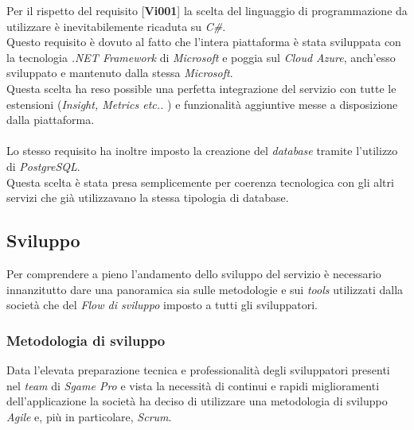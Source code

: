 \documentclass[11pt]{thesistemp}
\begin{document}
Per il rispetto del requisito [\textbf{Vi001}] la scelta del linguaggio di programmazione da utilizzare è inevitabilemente ricaduta su \textit{C\#}.\\
Questo requisito è dovuto al fatto che l'intera piattaforma è stata sviluppata con la tecnologia \textit{.NET Framework} di \textit{Microsoft} e poggia sul \textit{Cloud Azure}, anch'esso sviluppato e mantenuto dalla stessa \textit{Microsoft}.\\
Questa scelta ha reso possible una perfetta integrazione del servizio con tutte le estensioni (\textit{Insight, Metrics etc.. }) e funzionalità aggiuntive messe a disposizione dalla piattaforma.\\\\
Lo stesso requisito ha inoltre imposto la creazione del \textit{database} tramite l'utilizzo di \textit{PostgreSQL}.\\
Questa scelta è stata presa semplicemente per coerenza tecnologica con gli altri servizi che già utilizzavano la stessa tipologia di database.

\pagebreak
\subsection{Sviluppo}
Per comprendere a pieno l'andamento dello sviluppo del servizio è necessario innanzitutto dare una panoramica sia sulle metodologie e sui \textit{tools} utilizzati dalla società che del \textit{Flow di sviluppo} imposto a tutti gli sviluppatori.

\subsubsection{Metodologia di sviluppo}
Data l'elevata preparazione tecnica e professionalità degli sviluppatori presenti nel \textit{team} di \textit{Sgame Pro} e vista la necessità di continui e rapidi miglioramenti dell'applicazione la società ha deciso di utilizzare una metodologia di sviluppo \textit{Agile} e, più in particolare, \textit{Scrum}.
\end{document}
